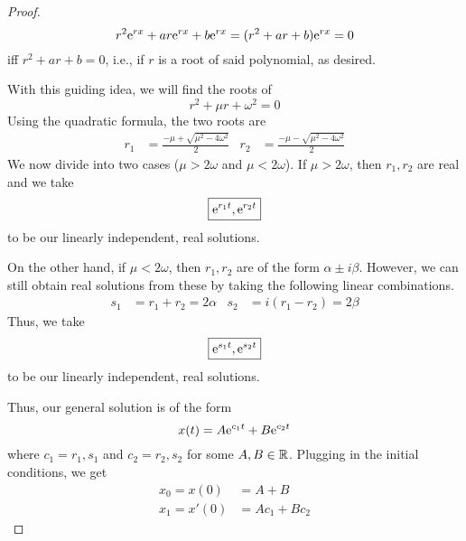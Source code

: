 \documentclass[../psets.tex]{subfiles}
\begin{document}
\begin{enumerate}
\begin{enumerate}
\begin{proof}
            \begin{equation*}
                r^2\e[rx]+ar\e[rx]+b\e[rx] = (r^2+ar+b)\e[rx]
                = 0
            \end{equation*}
            iff $r^2+ar+b=0$, i.e., if $r$ is a root of said polynomial, as desired.\par
            With this guiding idea, we will find the roots of
            \begin{equation*}
                r^2+\mu r+\omega^2 = 0
            \end{equation*}
            Using the quadratic formula, the two roots are
            \begin{align*}
                r_1 &= \frac{-\mu+\sqrt{\mu^2-4\omega^2}}{2}&
                r_2 &= \frac{-\mu-\sqrt{\mu^2-4\omega^2}}{2}
            \end{align*}
            We now divide into two cases ($\mu>2\omega$ and $\mu<2\omega$). If $\mu>2\omega$, then $r_1,r_2$ are real and we take
            \begin{equation*}
                \boxed{\e[r_1t],\e[r_2t]}
            \end{equation*}
            to be our linearly independent, real solutions.\par
            On the other hand, if $\mu<2\omega$, then $r_1,r_2$ are of the form $\alpha\pm i\beta$. However, we can still obtain real solutions from these by taking the following linear combinations.
            \begin{align*}
                s_1 &= r_1+r_2 = 2\alpha&
                s_2 &= i(r_1-r_2) = 2\beta
            \end{align*}
            Thus, we take
            \begin{equation*}
                \boxed{\e[s_1t],\e[s_2t]}
            \end{equation*}
            to be our linearly independent, real solutions.\par
            Thus, our general solution is of the form
            \begin{equation*}
                x(t) = A\e[c_1t]+B\e[c_2t]
            \end{equation*}
            where $c_1=r_1,s_1$ and $c_2=r_2,s_2$ for some $A,B\in\R$. Plugging in the initial conditions, we get
            \begin{align*}
                x_0 = x(0) &= A+B\\
                x_1 = x'(0) &= Ac_1+Bc_2
            \end{align*}

\end{proof}
\end{enumerate}
\end{enumerate}
\end{document}
